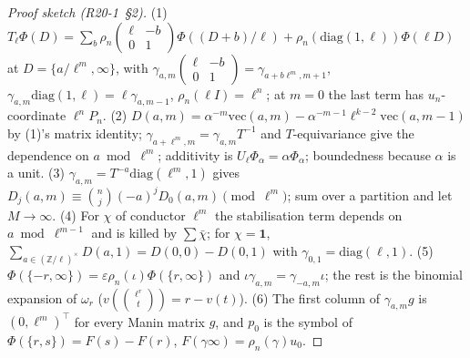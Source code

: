 \documentclass[11pt]{article}
\theoremstyle{remark}
\newcommand{\Z}{\mathbb{Z}}
\begin{document}
\begin{proof}[Proof sketch (R20-1~\S2)]
(1) $T_\ell\Phi(D)=\sum_b\rho_n(\begin{smallmatrix}\ell&-b\\0&1\end{smallmatrix})\Phi((D+b)/\ell)+\rho_n(\mathrm{diag}(1,\ell))\Phi(\ell D)$ at $D=\{a/\ell^{m},\infty\}$, with
$\gamma_{a,m}\begin{pmatrix}\ell&-b\\0&1\end{pmatrix}=\gamma_{a+b\ell^{m},m+1}$, $\gamma_{a,m}\mathrm{diag}(1,\ell)=\ell\gamma_{a,m-1}$, $\rho_n(\ell I)=\ell^{n}$; at $m=0$ the last term has
$u_n$-coordinate $\ell^{n}P_n$. (2) $D(a,m)=\alpha^{-m}\mathrm{vec}(a,m)-\alpha^{-m-1}\ell^{k-2}\mathrm{vec}(a,m-1)$ by (1)'s matrix identity; $\gamma_{a+\ell^{m},m}=\gamma_{a,m}T^{-1}$ and
$T$-equivariance give the dependence on $a\bmod\ell^{m}$; additivity is $U_\ell\Phi_\alpha=\alpha\Phi_\alpha$; boundedness because $\alpha$ is a unit. (3)
$\gamma_{a,m}=T^{-a}\mathrm{diag}(\ell^{m},1)$ gives $D_j(a,m)\equiv\binom nj(-a)^{j}D_0(a,m)\pmod{\ell^{m}}$; sum over a partition and let $M\to\infty$. (4) For $\chi$ of conductor
$\ell^{m}$ the stabilisation term depends on $a\bmod\ell^{m-1}$ and is killed by $\sum\bar\chi$; for $\chi=\mathbf 1$, $\sum_{a\in(\Z/\ell)^{\times}}D(a,1)=D(0,0)-D(0,1)$ with
$\gamma_{0,1}=\mathrm{diag}(\ell,1)$. (5) $\Phi(\{-r,\infty\})=\varepsilon\rho_n(\iota)\Phi(\{r,\infty\})$ and $\iota\gamma_{a,m}=\gamma_{-a,m}\iota$; the rest is the binomial expansion of
$\omega_r$ ($v(\binom{\ell^{r}}{t})=r-v(t)$). (6) The first column of $\gamma_{a,m}g$ is $(0,\ell^{m})^{\top}$ for every Manin matrix $g$, and $p_0$ is the symbol of
$\Phi(\{r,s\})=F(s)-F(r)$, $F(\gamma\infty)=\rho_n(\gamma)u_0$.
\end{proof}
\end{document}
